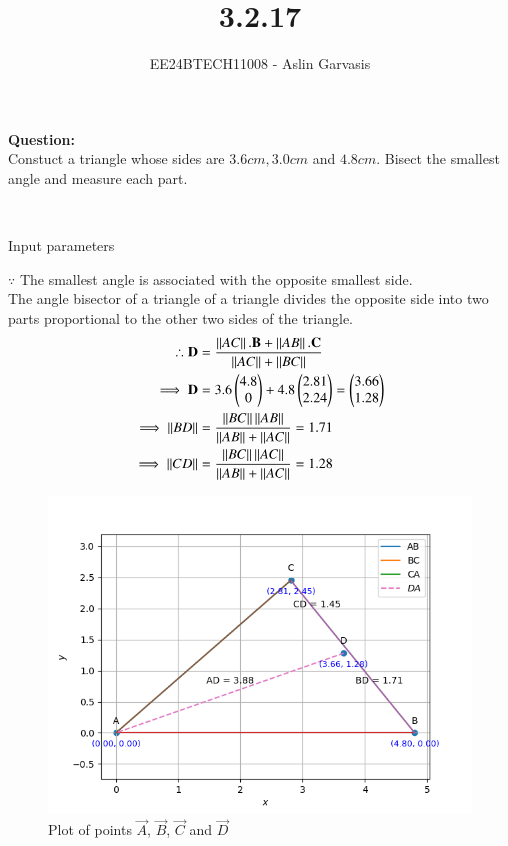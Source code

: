 \documentclass[journal]{IEEEtran}
\begin{document}

\vspace{3cm}
\title{3.2.17}
\author{EE24BTECH11008 - Aslin Garvasis
}
{\let\newpage\relax\maketitle}

\renewcommand{\thefigure}{\theenumi}
\renewcommand{\thetable}{\theenumi}
\setlength{\intextsep}{10pt} %


\renewcommand{\thetable}{\theenumi}
 \textbf{Question:}\\Constuct a triangle whose sides are $3.6cm, 3.0cm$ and $4.8cm.$ Bisect the smallest angle and measure each part.
 
 \solution \\ 
 \begin{table}[h!]    
  \centering
  
  \caption{Input parameters}
  \label{tab1.1.9.16}
\end{table}
$\because$ The smallest angle is associated with the opposite smallest side.\\
The angle bisector of a triangle of a triangle divides the opposite side into two parts proportional to the other two sides of the triangle.\\

\begin{align}
	\therefore \mathbf{D}&=\frac{\left\lVert AC\right\rVert.\mathbf{B}+\left\lVert AB\right\rVert.\mathbf{C}}{\left\lVert AC\right\rVert+\left\lVert BC\right\rVert}\\
	\implies \mathbf{D}&=3.6\begin{pmatrix}4.8\\0\end{pmatrix}+4.8\begin{pmatrix}2.81\\2.24\end{pmatrix}=\begin{pmatrix}3.66\\1.28\end{pmatrix}\\
	\implies \left\lVert BD\right\rVert&=\frac{\left\lVert BC\right\rVert\left\lVert AB\right\rVert}{\left\lVert AB\right\rVert+\left\lVert AC\right\rVert}=1.71\\
	\implies \left\lVert CD\right\rVert&=\frac{\left\lVert BC\right\rVert\left\lVert AC\right\rVert}{\left\lVert AB\right\rVert+\left\lVert AC\right\rVert}=1.28
 \end{align}
		\newpage


		\begin{figure}[h!]
                \centering
               \includegraphics[width=0.7\linewidth]{figs/Fig1.png}
			\caption{Plot of points $\vec{A}$, $\vec{B}$, $\vec{C}$ and $\vec{D}$}
               
               \end{figure}
\end{document}
